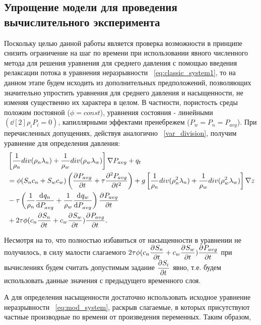 \subsection{Упрощение модели для проведения вычислительного эксперимента}

Поскольку целью данной работы является проверка возможности в принципе снизить ограничение на шаг по времени при
использовании явного численного метода для решения уравнения для среднего давления
с помощью введения релаксации потока в уравнения неразрывности ~\eqref{eq:classic_system1}, то на данном этапе
будем исходить из дополнительных предположений, позволяющих значительно упростить уравнения для среднего давления
и насыщенности, не изменяя существенно их характера в целом. В частности, пористость среды положим постояной ($\phi = const$),
уравнения состояния - линейными $\left( \dd[2]{\rho_i}{P_i} = 0 \right)$, капиллярными эффектами пренебрежем ($P_w = P_n = P_{avg}$).
При перечисленных допущениях, действуя аналогично ~\ref{var_division}, получим уравнение для определения давления:
\begin{equation} \label{eq:mod_pressure}
 \begin{aligned}
  &\left[ \frac{1}{\rho_n} div (\rho_n\lambda_n) + \frac{1}{\rho_w} div (\rho_w\lambda_w) \right] \nabla P_{avg}
  + q_t \\
  & = \phi (S_n c_n + S_w c_w) \left( \pd{P_{avg}}{t} + \tau \pd[2]{P_{avg}}{t} \right)
  + g \left[ \frac{1}{\rho_n} div (\rho_n^2\lambda_n) + \frac{1}{\rho_w} div (\rho_w^2\lambda_w) \right] \nabla z \\
  & -  \tau \left(\frac{1}{\rho_n}\dd{q_n}{P_{avg}} + \frac{1}{\rho_w}\dd{q_w}{P_{avg}}\right) \pd{P_{avg}}{t} \\
  & + 2 \tau \phi (c_n \pd{S_n}{t} + c_w\pd{S_w}{t}) \pd{P_{avg}}{t}.
 \end{aligned}
\end{equation}

Несмотря на то, что полностью избавиться от насыщенности в уравнении не получилось, в силу малости слагаемого
$2 \tau \phi (c_n \pd{S_n}{t} + c_w\pd{S_w}{t}) \pd{P_{avg}}{t}$
при вычислениях будем считать допустимым задание $\pd{S_i}{t}$ явно, т.е. будем использовать данные
значения с предыдущего временного слоя.

А для определения насыщенности достаточно использовать исходное уравнение неразрывности ~\eqref{eq:mod_system},
раскрыв слагаемые, в которых присутствуют частные производные по времени от произведения переменных. Таким образом,

